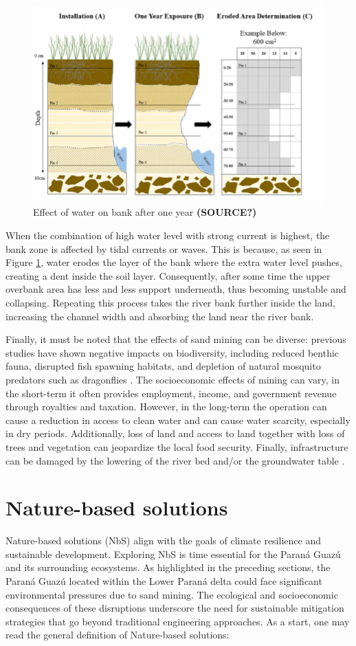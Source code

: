 \begin{figure}[H]
    \centering
    \includegraphics[width=0.5\linewidth]{figures/ch2/Erosion.png}
    \caption{Effect of water on bank after one year \textbf{(SOURCE?)}}
    \label{fig:Effect of Water on Bank after One Year}
\end{figure}

When the combination of high water level with strong current is highest, the bank zone is affected by tidal currents or waves. This is because, as seen in Figure \ref{fig:Effect of Water on Bank after One Year}, water erodes the layer of the bank where the extra water level pushes, creating a dent inside the soil layer.
Consequently, after some time the upper overbank area has less and less support underneath, thus becoming unstable and collapsing. 
Repeating this process takes the river bank further inside the land, increasing the channel width and absorbing the land near the river bank. 

Finally, it must be noted that the effects of sand mining can be diverse: previous studies have shown negative impacts on biodiversity, including reduced benthic fauna, disrupted fish spawning habitats, and depletion of natural mosquito predators such as dragonflies \autocite{sand-mining-boek}. The socioeconomic effects of mining can vary, in the short-term it often provides employment, income, and government revenue through royalties and taxation. However, in the long-term the operation can cause a reduction in access to clean water and can cause water scarcity, especially in dry periods. Additionally, loss of land and access to land together with loss of trees and vegetation can jeopardize the local food security. Finally, infrastructure can be damaged by the lowering of the river bed and/or the groundwater table \autocite{sand-mining-boek}.

\section{Nature-based solutions}
 Nature-based solutions (NbS) align with the goals of climate resilience and sustainable development. Exploring NbS is time essential for the Paraná Guazú and its surrounding ecosystems. As highlighted in the preceding sections, the Paraná Guazú located within the Lower Paraná delta could face significant environmental pressures due to sand mining. The ecological and socioeconomic consequences of these disruptions underscore the need for sustainable mitigation strategies that go beyond traditional engineering approaches. As a start, one may read the general definition of Nature-based solutions:


